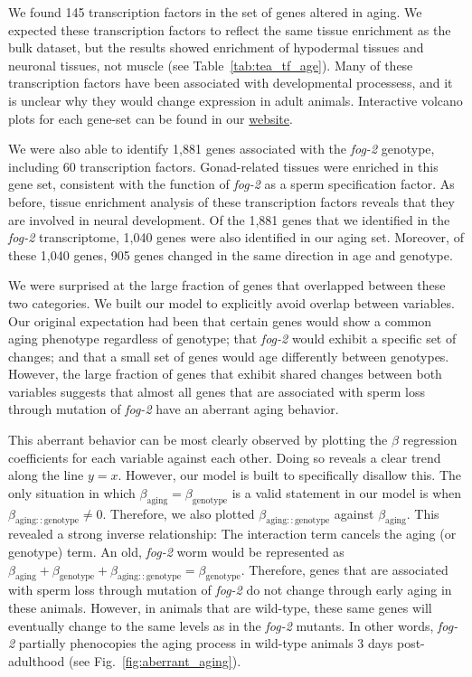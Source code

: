 \documentclass[9pt,twocolumn,twoside]{gsag3jnl}
\newcommand{\fog}{\emph{fog-2}}
\newcommand{\fogn}{1,881}
\newcommand{\coexpressed}{905}
\newcommand{\intersectn}{1,040}
\newcommand{\tfaging}{145}
\newcommand{\tffog}{60}
\newcommand{\webref}{
\href{https://wormlabcaltech.github.io/Angeles_Leighton_2016/}{website}}
\begin{document}
We found \tfaging{} transcription factors in the set of genes altered in aging. We expected these transcription factors to reflect the same tissue enrichment as the bulk dataset, but the results showed enrichment of hypodermal tissues and neuronal tissues, not muscle (see Table~\ref{tab:tea_tf_age}). Many of these transcription factors have been  associated with developmental processess, and it is unclear why they would change expression in adult animals. Interactive volcano plots for each gene-set can be found in our \webref{}.

We were also able to identify \fogn{} genes associated with the \fog{} genotype, including \tffog{} transcription factors. Gonad-related tissues were enriched in this gene set, consistent with the function of \fog{} as a sperm specification factor. As before, tissue enrichment analysis of these transcription factors reveals that they are involved in neural development. Of the \fogn{} genes that we identified in the \fog{} transcriptome, \intersectn{} genes were also identified in our aging set. Moreover, of these \intersectn{}  genes, \coexpressed{} genes changed in the same direction in age and genotype.

We were surprised at the large fraction of genes that overlapped between these two categories. We built our model to explicitly avoid overlap between variables. Our original expectation had been that certain genes would show a common aging phenotype regardless of genotype; that \fog{} would exhibit a specific set of changes; and that a small set of genes would age differently between genotypes. However, the large fraction of genes that exhibit shared changes between both variables suggests that almost all genes that are associated with sperm loss through mutation of \fog{} have an aberrant aging behavior.

This aberrant behavior can be most clearly observed by plotting the $\beta$ regression coefficients for each variable against each other. Doing so reveals a clear trend along the line $y=x$. However, our model is built to specifically disallow this. The only situation in which $\beta_\mathrm{aging} = \beta_\mathrm{genotype}$ is a valid statement in our model is when $\beta_\mathrm{aging::genotype} \neq 0$. Therefore, we also plotted $\beta_\mathrm{aging::genotype}$ against $\beta_\mathrm{aging}$. This revealed a strong inverse relationship: The interaction term cancels the aging (or genotype) term. An old, \fog{} worm would be represented as
$\beta_\mathrm{aging} +\beta_\mathrm{genotype} + \beta_\mathrm{aging::genotype} = \beta_\mathrm{genotype}$.
Therefore, genes that are associated with sperm loss through mutation of \fog{} do not change through early aging in these animals. However, in animals that are wild-type, these same genes will eventually change to the same levels as in the \fog{} mutants. In other words, \fog{} partially phenocopies the aging process in wild-type animals 3 days post-adulthood (see Fig.~\ref{fig:aberrant_aging}).
\end{document}
